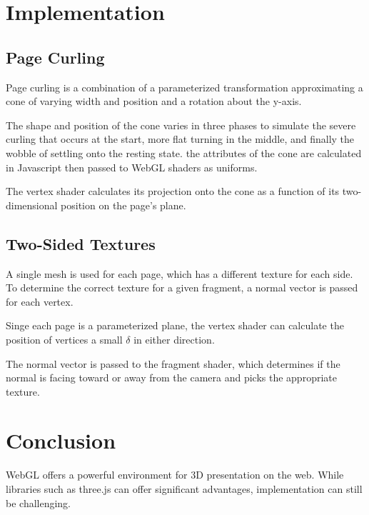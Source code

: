\documentclass{acmsiggraph}                     %
\begin{document}
\section{Implementation}
\subsection{Page Curling}
Page curling is a combination of a parameterized transformation approximating a cone  of varying width and position and a rotation about the y-axis.

The shape and position of the cone varies in three phases to simulate the severe curling that occurs at the start, more flat turning in the middle, and finally the wobble of settling onto the resting state. the attributes of the cone are calculated in Javascript then passed to WebGL shaders as uniforms.

The vertex shader calculates its projection onto the cone as a function of its two-dimensional position on the page's plane. 



\subsection{Two-Sided Textures}
A single mesh is used for each page, which has a different texture for each side. To determine the correct texture for a given fragment, a normal vector is passed for each vertex.

Singe each page is a parameterized plane, the vertex shader can calculate the position of vertices a small $\delta$ in either direction.

The normal vector is passed to the fragment shader, which determines if the normal is facing toward or away from the camera and picks the appropriate texture.


\section{Conclusion}

WebGL offers a powerful environment for 3D presentation on the web. While libraries such as three.js can offer significant advantages, implementation can still be challenging. 


\nocite{*}

\end{document}
